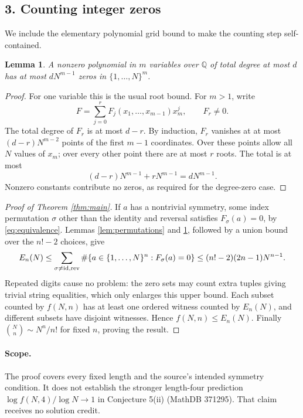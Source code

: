 \documentclass[11pt]{article}
\newtheorem{lemma}{Lemma}
\newcommand{\Q}{\mathbb Q}
\begin{document}
\subsection*{3. Counting integer zeros}
We include the elementary polynomial grid bound to make the counting
step self-contained.
\begin{lemma}\label{lem:grid}
A nonzero polynomial in $m$ variables over $\Q$ of total degree at
most $d$ has at most $dN^{m-1}$ zeros in $\{1,\ldots,N\}^m$.
\end{lemma}
\begin{proof}
For one variable this is the usual root bound.
For $m>1$, write
\[
 F=\sum_{j=0}^r F_j(x_1,\ldots,x_{m-1})x_m^j,\qquad F_r\ne0.
\]
The total degree of $F_r$ is at most $d-r$.
By induction, $F_r$ vanishes at at most $(d-r)N^{m-2}$ points of
the first $m-1$ coordinates. Over these points allow all $N$ values
of $x_m$; over every other point there are at most $r$ roots.
The total is at most
\[
 (d-r)N^{m-1}+rN^{m-1}=dN^{m-1}.
\]
Nonzero constants contribute no zeros, as required for the degree-zero
case.
\end{proof}

\begin{proof}[Proof of Theorem \ref{thm:main}]
If $a$ has a nontrivial symmetry, some index permutation $\sigma$
other than the identity and reversal satisfies $F_\sigma(a)=0$,
by \eqref{eq:equivalence}. Lemmas \ref{lem:permutations} and
\ref{lem:grid}, followed by a union bound over the $n!-2$ choices,
give
\[
 E_n(N)\le\sum_{\sigma\ne{\rm id},{\rm rev}}
             \#\{a\in\{1,\ldots,N\}^n:F_\sigma(a)=0\}
       \le(n!-2)(2n-1)N^{n-1}.
\]
Repeated digits cause no problem: the zero sets may count extra
tuples giving trivial string equalities, which only enlarges this
upper bound.
Each subset counted by $f(N,n)$ has at least one ordered witness
counted by $E_n(N)$, and different subsets have disjoint witnesses.
Hence $f(N,n)\le E_n(N)$.
Finally $\binom Nn\sim N^n/n!$ for fixed $n$, proving the result.
\end{proof}

\paragraph{Scope.}
The proof covers every fixed length and the source's intended
symmetry condition. It does not establish the stronger length-four
prediction $\log f(N,4)/\log N\to1$ in Conjecture 5(ii)
(MathDB 371295). That claim receives no solution credit.
\end{document}
